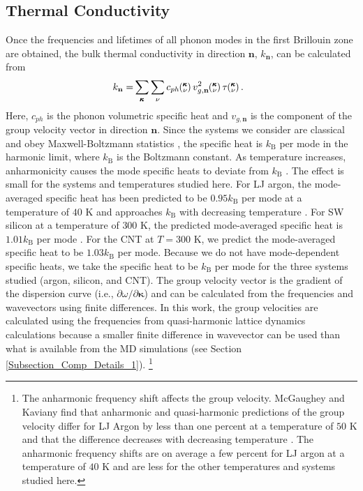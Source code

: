 \subsection{\label{Subsection_Comp_Details_3}Thermal Conductivity}
Once the frequencies and lifetimes of all phonon modes in the first
Brillouin zone are obtained, the bulk thermal conductivity in direction
$\mathbf{n}$, $k_{\mathbf{n}}$, can be calculated from 
\cite{ziman_electrons_2001}
\begin{equation}\label{E-size:k_bulk}\
\begin{split}
k_{\mathbf{n}}=&\sum_{\pmb{\kappa}} \sum_\nu c_{ph} \kv 
v^{2}_{g,\mathbf{n}} \kv \tau \kv.
\end{split}
\end{equation}
Here, $c_{ph}$ is the phonon volumetric specific heat and 
${v}_{g,\mathbf{n}}$ is
the component of the group velocity vector in direction $\mathbf{n}$. 
Since the systems 
we consider are classical and obey Maxwell-Boltzmann statistics 
\cite{mcquarrie_statistical_2000}, the
specific heat is $k_{\mathrm{B}}$ per mode in the harmonic limit, where 
$k_{\mathrm{B}}$ 
is the Boltzmann constant. As temperature increases, anharmonicity causes 
the mode specific 
heats to deviate from $k_{\mathrm{B}}$ \cite{mcgaughey_quantitative_2004}. 
The effect is small for the 
systems and temperatures studied here. For LJ argon, the mode-averaged 
specific heat has 
been predicted to be $0.95k_{\mathrm{B}}$ per mode at a temperature of 
$40$ K and approaches 
$k_{\mathrm{B}}$ with decreasing temperature 
\cite{mcgaughey_quantitative_2004}. For SW silicon at a 
temperature of $300$ K, the predicted mode-averaged specific heat is 
$1.01k_{\mathrm{B}}$ 
per mode \cite{goicochea_thermal_2010}. For the CNT at $T=300$ K, we 
predict the mode-averaged 
specific heat to be $1.03k_{\mathrm{B}}$ per mode. Because we do not have 
mode-dependent 
specific heats, we take the specific heat to be $k_{\mathrm{B}}$ per mode 
for the three 
systems studied (argon, silicon, and CNT).  The group velocity vector is 
the gradient of 
the dispersion curve (i.e., $\partial \omega / \partial \pmb{\kappa}$) and 
can be calculated 
from the frequencies and wavevectors using finite differences. In this 
work, the group 
velocities are calculated using the frequencies from quasi-harmonic 
lattice dynamics 
calculations because a smaller finite difference in wavevector can be used 
than what is 
available from the MD simulations (see Section 
\ref{Subsection_Comp_Details_1}).
\footnote{The anharmonic frequency shift affects the group velocity. 
McGaughey and Kaviany find that anharmonic and quasi-harmonic predictions 
of 
the group velocity differ for LJ Argon by less than one percent at a 
temperature of 
$50$ K and that the difference decreases with decreasing temperature 
\cite{mcgaughey_quantitative_2004}. 
The anharmonic frequency shifts are on average a few percent for LJ argon 
at a temperature 
of $40$ K and are less for the other temperatures and systems studied here.}

